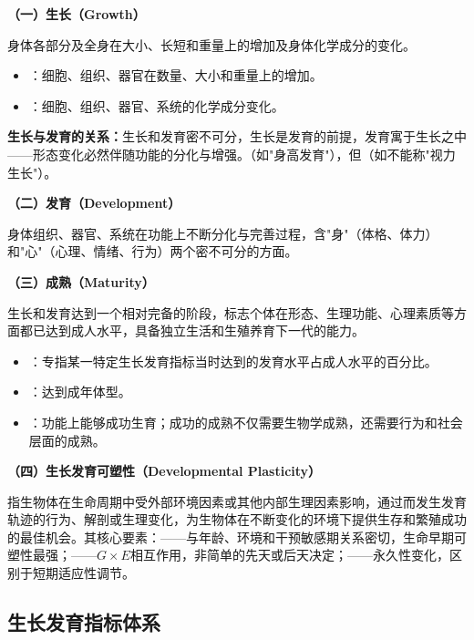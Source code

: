 \begin{keybox}
\textbf{（一）生长（Growth）}

身体各部分及全身在大小、长短和重量上的增加及身体化学成分的变化。
\begin{itemize}[leftmargin=*]
    \item {}：细胞、组织、器官在数量、大小和重量上的增加。
    \item {}：细胞、组织、器官、系统的化学成分变化。
\end{itemize}

\textbf{生长与发育的关系：}生长和发育密不可分，生长是发育的前提，发育寓于生长之中——形态变化必然伴随功能的分化与增强。（如"身高发育"），但（如不能称"视力生长"）。

\textbf{（二）发育（Development）}

身体组织、器官、系统在功能上不断分化与完善过程，含"身"（体格、体力）和"心"（心理、情绪、行为）两个密不可分的方面。

\textbf{（三）成熟（Maturity）}

生长和发育达到一个相对完备的阶段，标志个体在形态、生理功能、心理素质等方面都已达到成人水平，具备独立生活和生殖养育下一代的能力。

\begin{itemize}[leftmargin=*]
    \item {}：专指某一特定生长发育指标当时达到的发育水平占成人水平的百分比。
    \item {}：达到成年体型。
    \item {}：功能上能够成功生育；成功的成熟不仅需要生物学成熟，还需要行为和社会层面的成熟。
\end{itemize}

\textbf{（四）生长发育可塑性（Developmental Plasticity）}

指生物体在生命周期中受外部环境因素或其他内部生理因素影响，通过而发生发育轨迹的行为、解剖或生理变化，为生物体在不断变化的环境下提供生存和繁殖成功的最佳机会。其核心要素：——与年龄、环境和干预敏感期关系密切，生命早期可塑性最强；——$G \times E$相互作用，非简单的先天或后天决定；——永久性变化，区别于短期适应性调节。
\end{keybox}

\subsection{生长发育指标体系}

